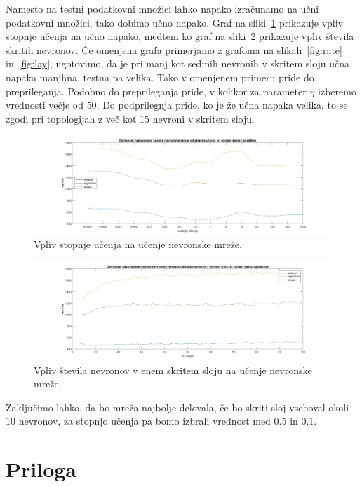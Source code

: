 \documentclass[mat1]{fmfdelo}
\begin{document}
Namesto na testni podatkovni množici lahko napako izračunamo na učni podatkovni množici, tako dobimo učno napako. Graf na sliki~\ref{fig:rate_l} prikazuje vpliv stopnje učenja na učno napako, medtem ko graf na sliki~\ref{fig:lay_l} prikazuje vpliv števila skritih nevronov. Če omenjena grafa primerjamo z grafoma na slikah~\ref{fig:rate} in~\ref{fig:lay}, ugotovimo, da je pri manj kot sedmih nevronih v skritem sloju učna napaka manjhna, testna pa velika. Tako v omenjenem primeru pride do preprileganja. Podobno do preprileganja pride, v kolikor za parameter $\eta$ izberemo vrednosti večje od $50$. Do podprilegnja pride, ko je že učna napaka velika, to se zgodi pri topologijah z več kot $15$ nevroni v skritem sloju.
%
\begin{figure}[!h]
	\centering
	\includegraphics[width=1\textwidth]{rate_learn.jpg}
	\caption{Vpliv stopnje učenja na učenje nevronske mreže.}
	\label{fig:rate_l}
\end{figure}
%
\begin{figure}[!ht]
	\centering
	\includegraphics[width=1\textwidth]{lay_learned.jpg}
	\caption{Vpliv števila nevronov v enem skritem sloju na učenje nevronske mreže.}
	\label{fig:lay_l}
\end{figure}
%
Zaključimo lahko, da bo mreža najbolje delovala, če bo skriti sloj vseboval okoli $10$ nevronov, za stopnjo učenja pa bomo izbrali vrednost med $0.5$ in $0.1$.
%
\section{Priloga} \label{priloga}
\inputminted{ocaml}{nevronske_mreze.ml}
\end{document}
